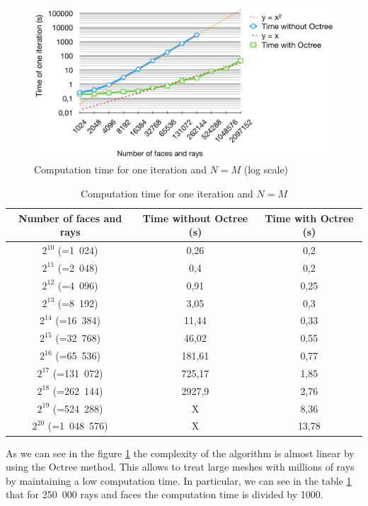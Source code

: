 \documentclass[AMA,STIX1COL]{WileyNJD-v2}
\begin{document}
\begin{figure}
\centering
	\includegraphics[width=0.8\linewidth]{times}
	\caption{Computation time for one iteration and $N = M$ (log scale)}
	\label{times}
\end{figure}

\begin{table}
\centering
	\begin{tabular}{| c | c | c |}
		\hline
		Number of faces and rays & Time \textbf{without} Octree (s) & Time \textbf{with} Octree (s)\\
		  \hline
		  \hline
		   $2^{10}$ (=1~024) & 0,26 &	0,2 \\
		   \hline
		$2^{11}$ (=2~048)  & 0,4	& 0,2 \\
		   \hline
		$2^{12}$ (=4~096) & 0,91	& 0,25\\
		   \hline
		$2^{13}$ (=8~192) & 3,05 &	0,3\\
		   \hline
		$2^{14}$ (=16~384) & 11,44	&0,33\\
		   \hline
		$2^{15}$ (=32~768) & 46,02	&0,55 \\
		     \hline
		    $2^{16}$ (=65~536) & 181,61	& 0,77\\
		   \hline
		$2^{17}$ (=131~072) & 725,17	& 1,85\\
		\hline
		$2^{18}$ (=262~144) & 2927,9 & 2,76 \\
		\hline
		$2^{19}$ (=524~288) & X & 8,36 \\
		\hline
		$2^{20}$ (=1~048~576) & X & 13,78 \\
		\hline
	 \end{tabular}
	\caption{Computation time for one iteration and $N = M$}
	\label{tabComplexite}
\end{table}

As we can see in the figure \ref{times} the complexity of the algorithm is almost linear by using the Octree method. This allows to treat large meshes with millions of rays by maintaining a low computation time. In particular, we can see in the table \ref{tabComplexite} that for 250~000 rays and faces the computation time is divided by 1000. 
\end{document}
